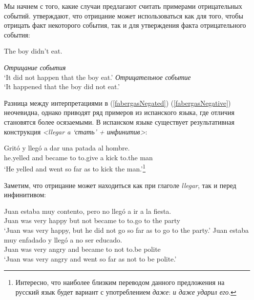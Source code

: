 \documentclass[a4paper, titlepage]{article}
\begin{document}
\medskip

Мы начнем с того, какие случаи \citep{fabergas2017building} предлагают считать примерами отрицательных событий. \citep{fabergas2017building} утверждают, что отрицание может использоваться как для того, чтобы отрицать факт некоторого события, так и для утверждения факта отрицательного события:

\begin{exe}
    \ex The boy didn't eat. \begin{xlist}
        \ex \label{fabergasNegated} {\footnotesize \textit{Отрицание события}} \\ `It did not happen that the boy eat.'
        \ex \label{fabergasNegative} {\footnotesize \textit{Отрицательное событие}} \\ `It happened that the boy did not eat.'
    \end{xlist}
\end{exe}

Разница между интерпретациями в (\ref{fabergasNegated}) (\ref{fabergasNegative}) неочевидна, однако \citep{fabergas2017building} приводят ряд примеров из испанского языка, где отличия становятся более осязаемыми. В испанском языке существует результативная конструкция \textit{<llegar a `стать' + инфинитив>}:

\medskip

\begin{exe}
    \ex \gll Gritó y llegó a dar una patada al hombre. \\
        he.yelled and became to to.give a kick to.the man \\
    \glt `He yelled and went so far as to kick the man.'\footnote{Интересно, что наиболее близким переводом данного предложения на русский язык будет вариант с употреблением \textit{даже}: \textit{и даже ударил его}.}
\end{exe}

Заметим, что отрицание может находиться как при глаголе \textit{llegar}, так и перед инфинитивом:

\begin{exe}
    \ex \begin{xlist}
        \ex \label{fabergasNegatedEvent} \gll Juan estaba muy contento, pero no llegó a ir a la fiesta. \\
            Juan was very happy but not became to to.go to the party \\
            \glt `Juan was very happy, but he did not go so far as to go to the party.'
        \ex \gll Juan estaba muy enfadado y llegó a no ser educado. \\
            Juan was very angry and became to not to.be polite \\
            \glt `Juan was very angry and went so far as not to be polite.'
    \end{xlist}
\end{exe}
\end{document}
